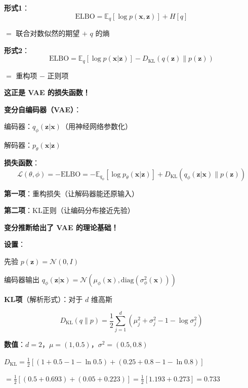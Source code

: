 \documentclass[12pt, a4paper]{ctexart}
\begin{document}
\begin{blackboard}[ELBO的两种形式]

\textbf{形式1}：
\[
\text{ELBO} = \mathbb{E}_q[\log p(\mathbf{x}, \mathbf{z})] + H[q]
\]

$= $ 联合对数似然的期望 $+$ $q$ 的熵

\textbf{形式2}：
\[
\text{ELBO} = \mathbb{E}_q[\log p(\mathbf{x} | \mathbf{z})] - D_{\text{KL}}(q(\mathbf{z}) \| p(\mathbf{z}))
\]

$= $ 重构项 $-$ 正则项

\textbf{这正是 VAE 的损失函数！}

\end{blackboard}

\begin{blackboard}[VAE损失函数的来源]

\textbf{变分自编码器（VAE）}：

编码器：$q_\phi(\mathbf{z} | \mathbf{x})$（用神经网络参数化）

解码器：$p_\theta(\mathbf{x} | \mathbf{z})$

\textbf{损失函数}：
\[
\mathcal{L}(\theta, \phi) = -\text{ELBO} = -\mathbb{E}_{q_\phi}[\log p_\theta(\mathbf{x} | \mathbf{z})] + D_{\text{KL}}(q_\phi(\mathbf{z} | \mathbf{x}) \| p(\mathbf{z}))
\]

\textbf{第一项}：重构损失（让解码器能还原输入）

\textbf{第二项}：KL正则（让编码分布接近先验）

\textbf{变分推断给出了 VAE 的理论基础！}

\end{blackboard}

\begin{blackboard}

\textbf{设置}：

先验 $p(\mathbf{z}) = \mathcal{N}(0, I)$

编码器输出 $q_\phi(\mathbf{z} | \mathbf{x}) = \mathcal{N}(\mu_\phi(\mathbf{x}), \text{diag}(\sigma^2_\phi(\mathbf{x})))$

\textbf{KL项}（解析形式）：对于 $d$ 维高斯

\[
D_{\text{KL}}(q \| p) = \frac{1}{2} \sum_{j=1}^d \left( \mu_j^2 + \sigma_j^2 - 1 - \log \sigma_j^2 \right)
\]

\textbf{数值}：$d = 2$，$\mu = (1, 0.5)$，$\sigma^2 = (0.5, 0.8)$

$D_{\text{KL}} = \frac{1}{2}[(1 + 0.5 - 1 - \ln 0.5) + (0.25 + 0.8 - 1 - \ln 0.8)]$

$= \frac{1}{2}[(0.5 + 0.693) + (0.05 + 0.223)] = \frac{1}{2}[1.193 + 0.273] = \mathbf{0.733}$

\end{blackboard}
\end{document}
